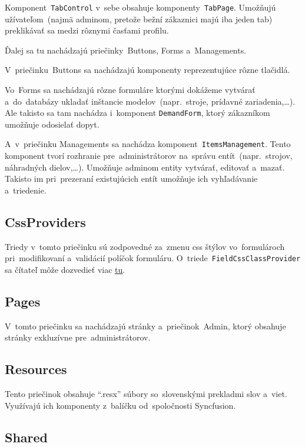 Komponent~\verb|TabControl| v~sebe obsahuje komponenty~\verb|TabPage|. Umožňujú užívateľom~(najmä adminom, pretože bežní zákaznici majú iba jeden tab) preklikávať sa medzi rôznymi časťami profilu.

Ďalej sa tu nachádzajú priečinky~Buttons, Forms a~Managements.

V~priečinku~Buttons sa nachádzajú komponenty reprezentujúce rôzne tlačidlá.

Vo~Forms sa nachádzajú rôzne formuláre ktorými dokážeme vytvárať a~do~databázy ukladať inštancie modelov~(napr.~stroje, prídavné zariadenia,\dots). Ale takisto sa tam nachádza i~komponent \verb|DemandForm|, ktorý zákazníkom umožňuje odosielať dopyt.

A~v~priečinku Managements sa nachádza komponent~\verb|ItemsManagement|. Tento komponent tvorí rozhranie pre~administrátorov na~správu entít~(napr.~strojov, náhradných dielov,\dots). Umožňuje adminom entity vytvárať, editovať a~mazať. Takisto im pri~prezeraní existujúcich entít umožňuje ich vyhľadávanie a~triedenie.

\subsection{CssProviders}

Triedy v~tomto priečinku sú zodpovedné za~zmenu css štýlov vo~formulároch pri~modifikovaní a~validácií políčok formuláru. O~triede~\verb|FieldCssClassProvider| sa čítateľ môže dozvedieť viac \href{https://learn.microsoft.com/en-us/dotnet/api/microsoft.aspnetcore.components.forms.fieldcssclassprovider?view=aspnetcore-7.0}{tu}.

\subsection{Pages}

V~tomto priečinku sa nachádzajú stránky a~priečinok~Admin, ktorý obsahuje stránky exkluzívne pre~administrátorov.

\subsection{Resources}

Tento priečinok obsahuje ``.resx'' súbory so~slovenskými prekladmi slov a~viet. Využívajú ich komponenty z~balíčku od~spoločnosti Syncfusion.

\subsection{Shared}

